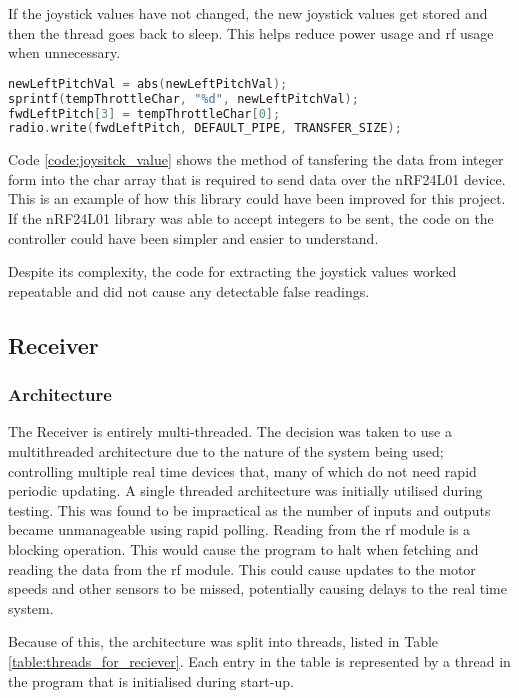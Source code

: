 \documentclass [11pt]{article}
\begin{document}
If the joystick values have not changed, the new joystick values get stored and then the thread goes back to sleep. This helps reduce power usage and \gls{rf} usage when unnecessary.

\begin{lstlisting}[language=C++,label=code:joysitck_value,caption= Joystick Value to Serial Data to be Sent]
newLeftPitchVal = abs(newLeftPitchVal);
sprintf(tempThrottleChar, "%d", newLeftPitchVal);
fwdLeftPitch[3] = tempThrottleChar[0];
radio.write(fwdLeftPitch, DEFAULT_PIPE, TRANSFER_SIZE);  
\end{lstlisting}

Code \ref{code:joysitck_value} shows the method of tansfering the data from integer form into the char array that is required to send data over the nRF24L01 device. This is an example of how this library could have been improved for this project. If the nRF24L01 library was able to accept integers to be sent, the code on the controller could have been simpler and easier to understand. 

Despite its complexity, the code for extracting the joystick values worked repeatable and did not cause any detectable false readings.
                

\subsection{Receiver}
\subsubsection{Architecture}

The Receiver is entirely multi-threaded. The decision was taken to use a multithreaded architecture due to the nature of the system being used; controlling multiple real time devices that, many of which do not need rapid periodic updating. A single threaded architecture was initially utilised during testing. This was found to be impractical as the number of inputs and outputs became unmanageable using rapid polling. Reading from the \gls{rf} module is a blocking operation. This would cause the program to halt when fetching and reading the data from the \gls{rf} module. This could cause updates to the motor speeds and other sensors to be missed, potentially causing delays to the real time system. 

Because of this, the architecture was split into threads, listed in Table \ref{table:threads_for_reciever}. Each entry in the table is represented by a thread in the program that is initialised during start-up.
\end{document}

